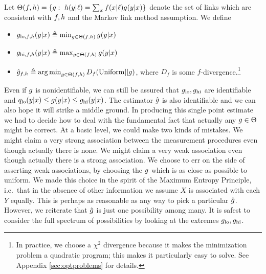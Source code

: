Let $\Theta(\plx,\ply)=\{\pxy:\ \ply(y|\ell) = \sum_x \plx(x|\ell)\pxy(y|x)\}$ denote the set of links which are consistent with $f,h$ and the Markov link method assumption.  We define
\begin{itemize}
    \item $g_{\mathrm{lo},f,h}(y|x) \triangleq \min_{g\in \Theta(f,h)} g(y|x)$
    \item $g_{\mathrm{hi},f,h}(y|x)\triangleq \max_{g\in \Theta(f,h)} g(y|x)$ 
    \item $\hat {g}_{f,h} \triangleq \operatorname*{arg\,min}_{g\in \Theta(f,h)} D_{f}(\mathrm{Uniform}||g)$, where $D_f$ is some $f$-divergence.\footnote{In practice, we choose a $\chi^2$ divergence because it makes the minimization problem a quadratic program; this makes it particularly easy to solve.  See Appendix \ref{sec:optproblems} for details.}
\end{itemize}
Even if $g$ is nonidentifiable, we can still be assured that $g_{\mathrm{lo}}, g_{\mathrm{hi}}$ are identifiable and $q_{\mathrm{lo}}(y|x) \leq g(y|x) \leq g_{\mathrm{hi}}(y|x)$.  The estimator $\hat {g}$ is also identifiable and we can also hope it will strike a middle ground.  In producing this single point estimate we had to decide how to deal with the fundamental fact that actually any $g \in \Theta$ might be correct.  At a basic level, we could make two kinds of mistakes.  We might claim a very strong association between the measurement procedures even though actually there is none.  We might claim a very weak association even though actually there is a strong association.  We choose to err on the side of asserting weak associations, by choosing the $g$ which is as close as possible to uniform.  We made this choice in the spirit of the Maximum Entropy Principle, i.e.\ that in the absence of other information we assume $X$ is associated with each $Y$ equally.  This is perhaps as reasonable as any way to pick a particular $\hat {g}$.  However, we reiterate that $\hat {g}$ is just one possibility among many.  It is safest to consider the full spectrum of possibilities by looking at the extremes $g_{\mathrm{lo}}, g_{\mathrm{hi}}$.

